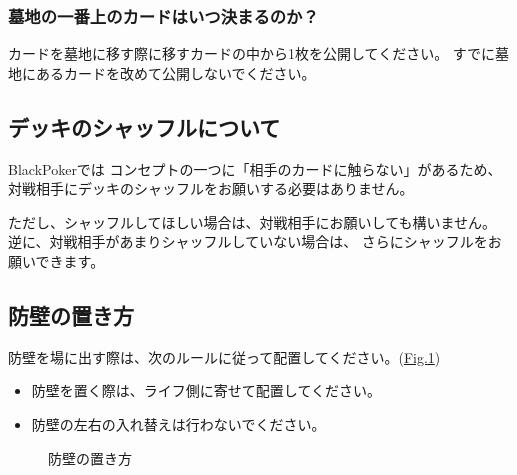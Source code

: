 \documentclass[letterpaper,10pt,dvipdfmx]{sphinxmanual}
\begin{document}
\subsubsection{墓地の一番上のカードはいつ決まるのか？}
\label{\detokenize{common/common:id41}}
\sphinxAtStartPar
カードを墓地に移す際に移すカードの中から1枚を公開してください。
すでに墓地にあるカードを改めて公開しないでください。


\subsection{デッキのシャッフルについて}
\label{\detokenize{common/common:id42}}
\sphinxAtStartPar
BlackPokerでは
コンセプトの一つに「相手のカードに触らない」があるため、
対戦相手にデッキのシャッフルをお願いする必要はありません。

\sphinxAtStartPar
ただし、シャッフルしてほしい場合は、対戦相手にお願いしても構いません。
逆に、対戦相手があまりシャッフルしていない場合は、
さらにシャッフルをお願いできます。


\subsection{防壁の置き方}
\label{\detokenize{common/common:id43}}
\sphinxAtStartPar
防壁を場に出す際は、次のルールに従って配置してください。(\hyperref[\detokenize{common/common:set-bulwork}]{Fig.\@ \ref{\detokenize{common/common:set-bulwork}}})
\begin{itemize}
\item {} 
\sphinxAtStartPar
防壁を置く際は、ライフ側に寄せて配置してください。

\item {} 
\sphinxAtStartPar
防壁の左右の入れ替えは行わないでください。

\end{itemize}

\begin{figure}[htbp]
\centering
\capstart

\noindent{}
\caption{防壁の置き方}\label{\detokenize{common/common:id54}}\label{\detokenize{common/common:set-bulwork}}\end{figure}
\end{document}
